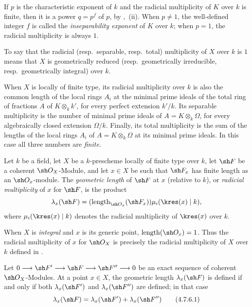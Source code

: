 If $p$ is the characteristic exponent of $k$ and the radicial
multiplicity of $K$ over $k$ is finite, then it is a power
$q=p^f$ of $p$, by ,~(ii).
When $p\ne1$, the well-defined integer $f$ is called the
\emph{inseparability exponent} of $K$ over $k$; when $p=1$, the
radicial multiplicity is always $1$.

To say that the radicial (resp.\ separable, resp.\ total)
multiplicity of $X$ over $k$ is $1$ means that $X$ is geometrically
reduced (resp.\ geometrically irreducible, resp.\ geometrically
integral) over $k$.

When $X$ is locally of finite type, its radicial multiplicity over
$k$ is also the common length of the local rings $A_i$ at
the minimal prime ideals of the total ring of fractions $A$ of
$K\otimes_k k'$, for every perfect extension $k'/k$.
Its separable multiplicity is the number of minimal prime ideals of
$A=K\otimes_k\Omega$, for every algebraically closed extension
$\Omega/k$.
Finally, its total multiplicity is the sum of the lengths of the local
rings $A_i$ of $A=K\otimes_k\Omega$ at its minimal prime
ideals.
In this case all three numbers are \emph{finite}.

\begin{definition}[4.7.5]
\label{IV.4.7.5}
Let $k$ be a field, let $X$ be a $k$-prescheme locally of finite type
over $k$, let $\sh F$ be a coherent $\sh O_X$-Module, and let $x\in X$
be such that $\sh F_x$ has finite length as an $\sh O_x$-module.
The \emph{geometric length} of $\sh F$ at $x$ (relative to $k$), or
\emph{radicial multiplicity} of $x$ for $\sh F$, is the product
\[
\lambda_x(\sh F)
=(\operatorname{length}_{\sh O_x}(\sh F_x))
 \mu_i(\kres(x)\mid k),
\]
where $\mu_i(\kres(x)\mid k)$ denotes the radicial multiplicity of
$\kres(x)$ over $k$.
\end{definition}

When $X$ is \emph{integral} and $x$ is its generic point,
$\operatorname{length}(\sh O_x)=1$.
Thus the radicial multiplicity of $x$ for $\sh O_X$ is precisely the
radicial multiplicity of $X$ over $k$ defined in
.


\begin{proposition}[4.7.6]
\label{IV.4.7.6}
Let $0\longrightarrow\sh F'\longrightarrow\sh F
\longrightarrow\sh F''\longrightarrow0$
be an exact sequence of coherent $\sh O_X$-Modules.
At a point $x\in X$, the geometric length $\lambda_x(\sh F)$ is
defined if and only if both $\lambda_x(\sh F')$ and
$\lambda_x(\sh F'')$ are defined; in that case
\begin{equation}
\lambda_x(\sh F)=\lambda_x(\sh F')+\lambda_x(\sh F'')
\tag{4.7.6.1}
\label{IV.4.7.6.1}
\end{equation}
\end{proposition}

